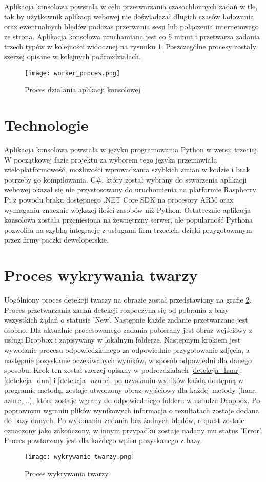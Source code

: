Aplikacja konsolowa powstała w celu przetwarzania czasochłonnych zadań w tle, tak by użytkownik aplikacji webowej nie doświadczał długich czasów ładowania oraz ewentualnych błędów podczas przerwania sesji lub połączenia internetowego ze stroną. Aplikacja konsolowa uruchamiana jest co 5 minut i przetwarza zadania trzech typów w kolejności widocznej na rysunku \ref{fig:worker_proces}. Poszczególne procesy zostały szerzej opisane w kolejnych podrozdziałach.
\begin{figure}[H]
	\centering
	\texttt{[image: worker\_proces.png]}
	\caption{Proces działania aplikacji konsolowej}
	\label{fig:worker_proces}
\end{figure}

\section{Technologie}
Aplikacja konsolowa powstała w języku programowania Python w wersji trzeciej. W początkowej fazie projektu za wyborem tego języka przemawiała wieloplatformowość, możliwości wprowadzania szybkich zmian w kodzie i brak potrzeby go kompilowania. C\#, który został wybrany do stworzenia aplikacji webowej okazał się nie przystosowany do uruchomienia na platformie Raspberry Pi z powodu braku dostępnego .NET Core SDK na procesory ARM oraz wymaganiu znacznie większej ilości zasobów niż Python. Ostatecznie aplikacja konsolowa została przeniesiona na zewnętrzny serwer, ale popularność Pythona pozwoliła na szybką integrację z usługami firm trzecich, dzięki przygotowanym przez firmy paczki deweloperskie.

\section{Proces wykrywania twarzy}
Uogólniony proces detekcji twarzy na obrazie został przedstawiony na grafie \ref{fig:wykrywanie_proces}.
Proces przetwarzania zadań detekcji rozpoczyna się od pobrania z bazy wszystkich żądań o statusie 'New'. Następnie każde zadanie przetwarzane jest osobno. Dla aktualnie procesowanego zadania pobierany jest obraz wejściowy z usługi Dropbox i zapisywany w lokalnym folderze. Następnym krokiem jest wywołanie procesu odpowiedzialnego za odpowiednie przygotowanie zdjęcia, a następnie pozyskanie oczekiwanych wyników, w sposób odpowiedni dla danego sposobu. Krok ten został szerzej opisany w podrozdziałach \ref{detekcja_haar}, \ref{detekcja_dnn} i \ref{detekcja_azure}. po uzyskaniu wyników każdą dostępną w programie metodą, zostaje utworzony obraz wyjściowy dla każdej metody (haar, azure, ..), które zostaje wgrany do odpowiedniego folderu w usłudze Dropbox. Po poprawnym wgraniu plików wynikowych informacja o rezultatach zostaje dodana do bazy danych. Po wykonaniu zadania bez żadnych błędów, request zostaje oznaczony jako zakończony, w innym przypadku zostaje nadany mu status 'Error'. Proces powtarzany jest dla każdego wpisu pozyskanego z bazy.
\begin{figure}[H]
	\centering
	\texttt{[image: wykrywanie\_twarzy.png]}
	\caption{Proces wykrywania twarzy}
	\label{fig:wykrywanie_proces}
\end{figure}

